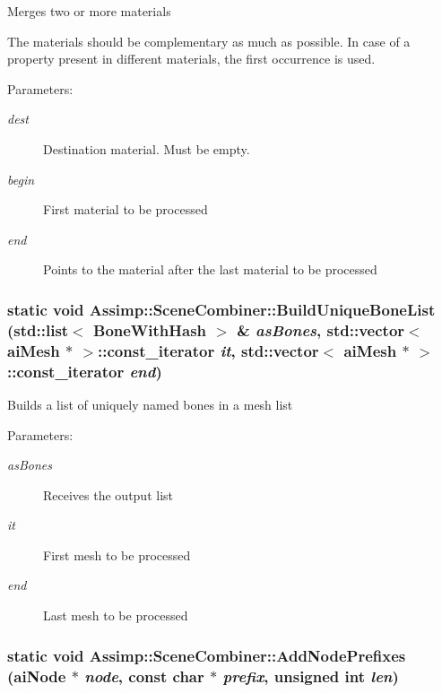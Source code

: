 Merges two or more materials

The materials should be complementary as much as possible. In case of a property present in different materials, the first occurrence is used.

\begin{Desc}
\item[Parameters:]
\begin{description}
\item[{\em dest}]Destination material. Must be empty. \item[{\em begin}]First material to be processed \item[{\em end}]Points to the material after the last material to be processed \end{description}
\end{Desc}
\hypertarget{class_assimp_1_1_scene_combiner_9bfbbbab2ece2925fc3628c587ea9dcc}{
\subsubsection[BuildUniqueBoneList]{\setlength{\rightskip}{0pt plus 5cm}static void Assimp::SceneCombiner::BuildUniqueBoneList (std::list$<$ {\bf BoneWithHash} $>$ \& {\em asBones}, \/  std::vector$<$ {\bf aiMesh} $\ast$ $>$::const\_\-iterator {\em it}, \/  std::vector$<$ {\bf aiMesh} $\ast$ $>$::const\_\-iterator {\em end})}}
\label{class_assimp_1_1_scene_combiner_9bfbbbab2ece2925fc3628c587ea9dcc}


Builds a list of uniquely named bones in a mesh list

\begin{Desc}
\item[Parameters:]
\begin{description}
\item[{\em asBones}]Receives the output list \item[{\em it}]First mesh to be processed \item[{\em end}]Last mesh to be processed \end{description}
\end{Desc}
\hypertarget{class_assimp_1_1_scene_combiner_5e4ec755bb270b894e37d20938a4a88b}{
\subsubsection[AddNodePrefixes]{\setlength{\rightskip}{0pt plus 5cm}static void Assimp::SceneCombiner::AddNodePrefixes ({\bf aiNode} $\ast$ {\em node}, \/  const char $\ast$ {\em prefix}, \/  unsigned int {\em len})}}
\label{class_assimp_1_1_scene_combiner_5e4ec755bb270b894e37d20938a4a88b}


